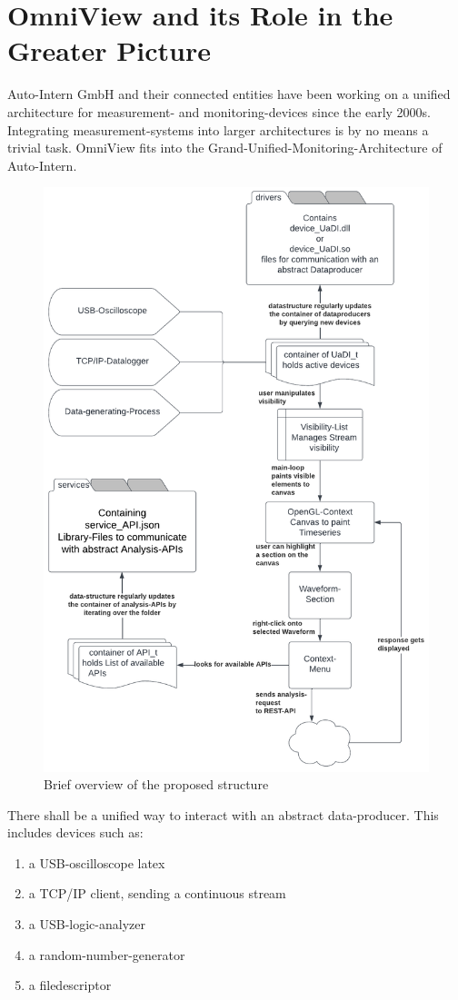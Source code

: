 \documentclass{scrreprt}
\begin{document}
\section[Greater Picture]{OmniView and its Role in the Greater Picture}
Auto-Intern GmbH and their connected entities have been working on a unified architecture for measurement- and monitoring-devices since the early 2000s. 
Integrating measurement-systems into larger architectures is by no means a trivial task.
OmniView fits into the Grand-Unified-Monitoring-Architecture of Auto-Intern.


\begin{figure}
    \includegraphics[width=.9\textwidth]{./assets/pictures/overview.pdf}
    \caption[]{Brief overview of the proposed structure}
    \label{fig:overview}
\end{figure}


There shall be a unified way to interact with an abstract data-producer.
This includes devices such as:
\begin{enumerate}
    \item a USB-oscilloscope \gls{latex}
    \item a TCP/IP client, sending a continuous stream
    \item a USB-logic-analyzer
    \item a random-number-generator
    \item a filedescriptor
\end{enumerate}
\end{document}

